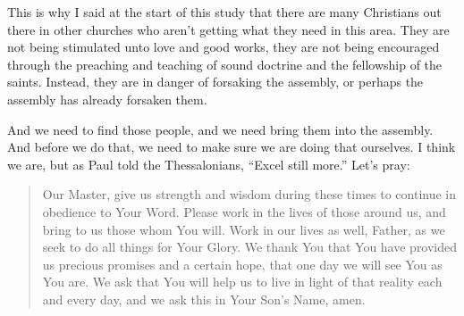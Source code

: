 \documentclass[letterpaper, 12pt]{article}
\begin{document}
    This is why I said at the start of this study that there are many
    Christians out there in other churches who aren't getting what they
    need in this area. They are not being stimulated unto love and good
    works, they are not being encouraged through the preaching and
    teaching of sound doctrine and the fellowship of the saints.
    Instead, they are in danger of forsaking the assembly, or perhaps
    the assembly has already forsaken them. 

    And we need to find those people, and we need bring them into the
    assembly. And before we do that, we need to make sure we are doing
    that ourselves. I think we are, but as Paul told the Thessalonians,
    ``Excel still more.'' Let's pray:

    \begin{quote}

        Our Master, give us strength and wisdom during these times to
        continue in obedience to Your Word. Please work in the lives of
        those around us, and bring to us those whom You will. Work in
        our lives as well, Father, as we seek to do all things for Your
        Glory. We thank You that You have provided us precious promises
        and a certain hope, that one day we will see You as You are. We
        ask that You will help us to live in light of that reality each
        and every day, and we ask this in Your Son's Name, amen.

    \end{quote}
\end{document}
